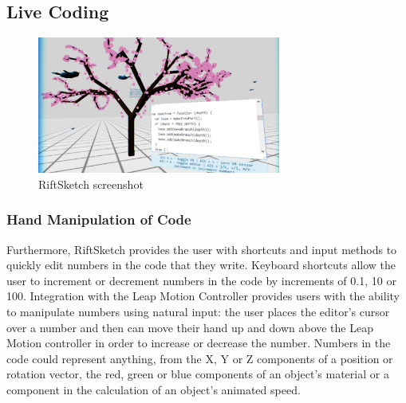 \documentclass[conference]{IEEEtran}
\begin{document}
  

  
  

\subsection{Live Coding}

\begin{figure}[ht!]
\centering
\includegraphics[width=80mm]{figures/riftsketch/closer}
\caption{RiftSketch screenshot \label{riftsketch}}
\end{figure}

\subsubsection{Hand Manipulation of Code}

Furthermore, RiftSketch provides the user with shortcuts and input methods to quickly edit numbers in the code that they write. 
Keyboard shortcuts allow the user to increment or decrement numbers in the code by increments of 0.1, 10 or 100. 
Integration with the Leap Motion Controller provides users with the ability to manipulate numbers using natural input: the user places the editor's cursor over a number and then can move their hand up and down above the Leap Motion controller in order to increase or decrease the number. 
Numbers in the code could represent anything, from the X, Y or Z components of a position or rotation vector, the red, green or blue components of an object's material or a component in the calculation of an object's animated speed.
\end{document}
